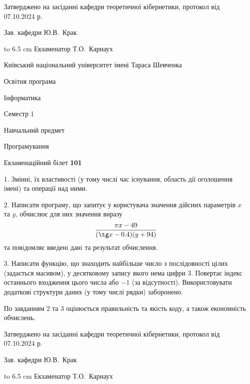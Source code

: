 \documentclass[12pt, ukrainian]{article}
\begin{document}
{\smallskip\smallskip \begin {scriptsize} Затверджено на засіданні кафедри теоретичної кібернетики, протокол   від   07.10.2024 р.\par\smallskip\smallskip\smallskip\smallskip
{\parbox {6.5 cm} {Зав. кафедри \dotfill Ю.В.~Крак}}\hspace {0.7cm} {\hbox to 6.5 cm { Екзаменатор \dotfill Т.О.~Карнаух}} \end{scriptsize}}
\vspace{0.9cm}
{{\begin {scriptsize}\par
{ \center  Київський національний університет імені Тараса Шевченка \par}
{\parbox {5 cm}{Освітня програма \hfill}{\parbox {7 cm}{Інформатика\hfill}}\parbox {6 cm}{\hfill Семестр 1}}\par
{\parbox {5 cm} {Навчальний предмет \hfill}\parbox {7 cm}{Програмування \hfill}\parbox {6cm}{\hfill}\par}\vspace{-15pt} \end{scriptsize}}{\center Екзаменаційний білет \No \textbf { 101 }\par}}
{%
1. Змінні, їх властивості (у тому числі час існування, область дії оголошення імені) та операції над ними.%
\par
2. Написати програму, що запитує у користувача значення дійсних параметрів $x$ та $y$, обчислює для них значення виразу 
$$\frac{\pi x - 49}{(\tg x - 0.4) (y + 94)}$$ 
та повiдомляє введенi данi та результат обчислення.

\par
3. Написати функцію, що знаходить найбільше число з послідовності цілих (задається масивом), у десятковому запису якого нема цифри 3. Повертає індекс останнього входження цього числа або $-1$ (за відсутності). Використовувати додаткові структури даних (у тому числі рядки) заборонено.

По завданням 2 та 3 оцінюється правильність та якість коду, а також економність обчислень.

}
{\smallskip\smallskip \begin {scriptsize} Затверджено на засіданні кафедри теоретичної кібернетики, протокол   від   07.10.2024 р.\par\smallskip\smallskip\smallskip\smallskip
{\parbox {6.5 cm} {Зав. кафедри \dotfill Ю.В.~Крак}}\hspace {0.7cm} {\hbox to 6.5 cm { Екзаменатор \dotfill Т.О.~Карнаух}} \end{scriptsize}}
\end{document}
